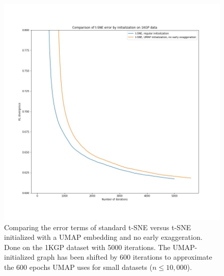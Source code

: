 \documentclass[12pt]{pnas-new}
\begin{document}
\begin{figure}[!htb]
    \centering
    \includegraphics[width=0.95\columnwidth]{images/tsne_umap_graph_1kgp.jpeg}
    \caption{Comparing the error terms of standard t-SNE versus t-SNE initialized with a UMAP embedding and no early exaggeration. Done on the 1KGP dataset with 5000 iterations. The UMAP-initialized graph has been shifted by 600 iterations to approximate the 600 epochs UMAP uses for small datasets ($n\leq10,000$).}
    \label{fig:supp_tsne_umap_compare_1kgp_graph}
\end{figure}
\end{document}
